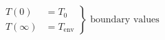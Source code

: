 \[
    \left.
    \begin{aligned}
        T(0) &= T_0 \\
        T(\infty) &= T_{\mathrm{env}}
    \end{aligned}
    \right\} \text{ boundary values}
\]
